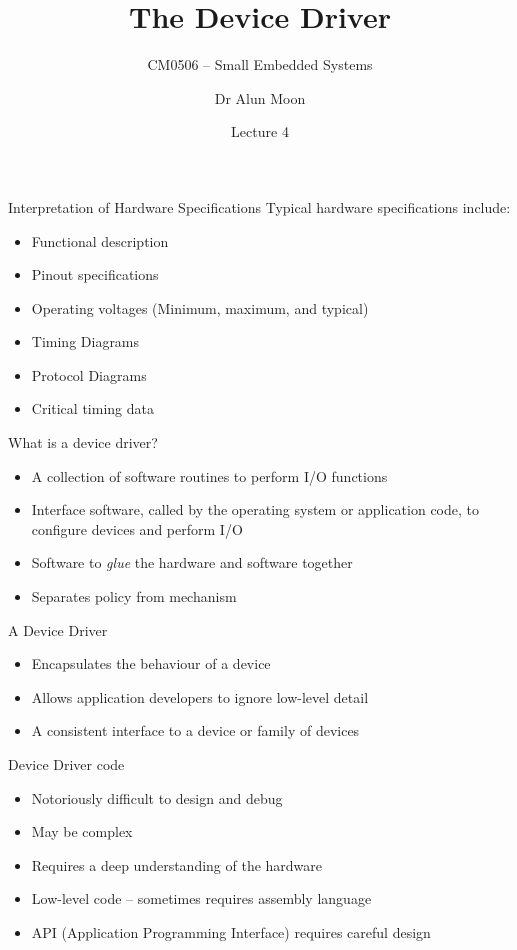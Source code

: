 \documentclass[svgnames,x11names]{beamer}
\title{The Device Driver}
\subtitle{CM0506 -- Small Embedded Systems}
\date{Lecture 4}
\author{Dr Alun Moon}
\institute[CIS]{Department of Computer and Information Science}
\begin{document}
\frame\maketitle

\begin{frame}{Interpretation of Hardware Specifications}
Typical hardware specifications include:
\begin{itemize}
\item Functional description
\item Pinout specifications
\item Operating voltages (Minimum, maximum, and typical)
\item Timing Diagrams
\item Protocol Diagrams
\item Critical timing data
\end{itemize}
\end{frame}

\begin{frame}{What is a \alert{device driver}?}
  \begin{itemize}
  \item A collection of software routines to perform I/O functions
  \item Interface software, called by the operating system or
    application code, to configure devices and perform I/O
  \item Software to \emph{glue} the hardware and software together
  \item Separates policy from mechanism
  \end{itemize}
\end{frame}

\begin{frame}{A Device Driver}
  \begin{itemize}
  \item Encapsulates the behaviour of a device
  \item Allows application developers to ignore low-level detail
  \item A consistent interface to a device or family of devices
  \end{itemize}
\end{frame}

\begin{frame}{Device Driver code}
  \begin{itemize}
  \item Notoriously difficult to design and debug
  \item May be complex
  \item Requires a deep understanding of the hardware
  \item Low-level code -- sometimes requires assembly language
  \item API (Application Programming Interface) requires careful design
  \end{itemize}
\end{frame}
\end{document}
